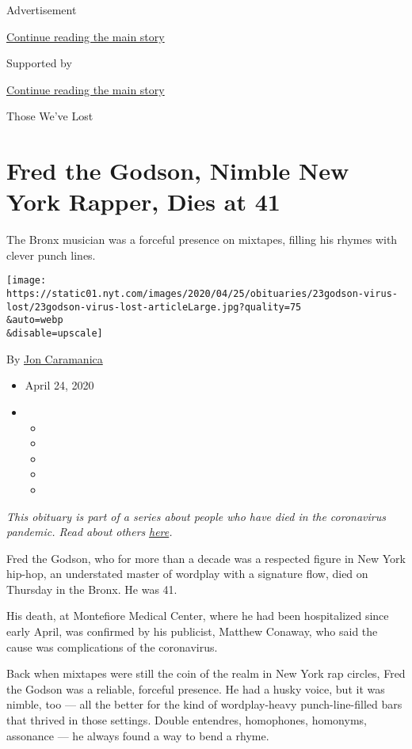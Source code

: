 Advertisement

\protect\hyperlink{after-top}{Continue reading the main story}

Supported by

\protect\hyperlink{after-sponsor}{Continue reading the main story}

Those We've Lost

\hypertarget{fred-the-godson-nimble-new-york-rapper-dies-at-41}{%
\section{Fred the Godson, Nimble New York Rapper, Dies at
41}\label{fred-the-godson-nimble-new-york-rapper-dies-at-41}}

The Bronx musician was a forceful presence on mixtapes, filling his
rhymes with clever punch lines.

\texttt{[image: https://static01.nyt.com/images/2020/04/25/obituaries/23godson-virus-lost/23godson-virus-lost-articleLarge.jpg?quality=75\\\&auto=webp\\\&disable=upscale]}

By \href{https://www.nytimes.com/by/jon-caramanica}{Jon Caramanica}

\begin{itemize}
\item
  April 24, 2020
\item
  \begin{itemize}
  \item
  \item
  \item
  \item
  \item
  \end{itemize}
\end{itemize}

\emph{This obituary is part of a series about people who have died in
the coronavirus pandemic. Read about others}
\href{https://www.nytimes.com/series/people-who-have-died-of-the-coronavirus}{\emph{here}}\emph{.}

Fred the Godson, who for more than a decade was a respected figure in
New York hip-hop, an understated master of wordplay with a signature
flow, died on Thursday in the Bronx. He was 41.

His death, at Montefiore Medical Center, where he had been hospitalized
since early April, was confirmed by his publicist, Matthew Conaway, who
said the cause was complications of the coronavirus.

Back when mixtapes were still the coin of the realm in New York rap
circles, Fred the Godson was a reliable, forceful presence. He had a
husky voice, but it was nimble, too --- all the better for the kind of
wordplay-heavy punch-line-filled bars that thrived in those settings.
Double entendres, homophones, homonyms, assonance --- he always found a
way to bend a rhyme.

